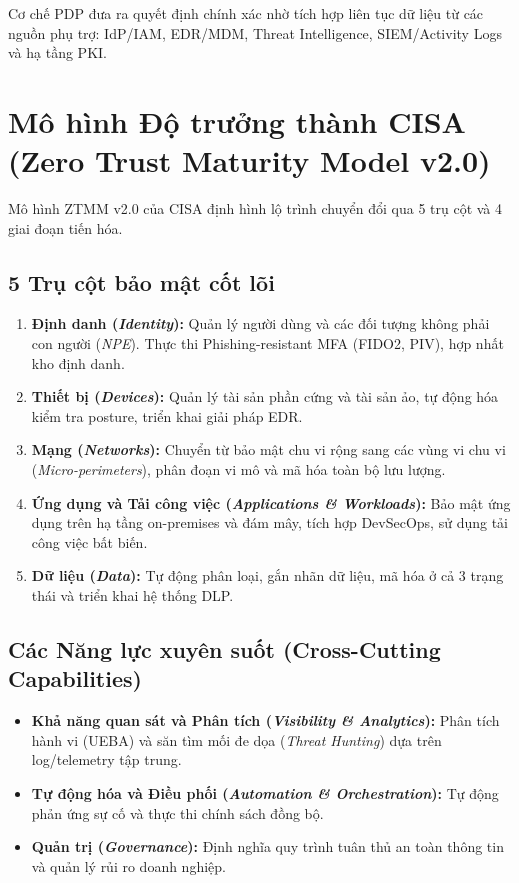 Cơ chế PDP đưa ra quyết định chính xác nhờ tích hợp liên tục dữ liệu từ các nguồn phụ trợ: IdP/IAM, EDR/MDM, Threat Intelligence, SIEM/Activity Logs và hạ tầng PKI.

\section{Mô hình Độ trưởng thành CISA (Zero Trust Maturity Model v2.0)}
\label{sec:2_2}

Mô hình ZTMM v2.0 của CISA định hình lộ trình chuyển đổi qua 5 trụ cột và 4 giai đoạn tiến hóa.

\subsection{5 Trụ cột bảo mật cốt lõi}
\label{subsec:2_2_1}

\begin{enumerate}
    \item \textbf{Định danh (\textit{Identity}):} Quản lý người dùng và các đối tượng không phải con người (\textit{NPE}). Thực thi Phishing-resistant MFA (FIDO2, PIV), hợp nhất kho định danh.
    \item \textbf{Thiết bị (\textit{Devices}):} Quản lý tài sản phần cứng và tài sản ảo, tự động hóa kiểm tra posture, triển khai giải pháp EDR.
    \item \textbf{Mạng (\textit{Networks}):} Chuyển từ bảo mật chu vi rộng sang các vùng vi chu vi (\textit{Micro-perimeters}), phân đoạn vi mô và mã hóa toàn bộ lưu lượng.
    \item \textbf{Ứng dụng và Tải công việc (\textit{Applications \& Workloads}):} Bảo mật ứng dụng trên hạ tầng on-premises và đám mây, tích hợp DevSecOps, sử dụng tải công việc bất biến.
    \item \textbf{Dữ liệu (\textit{Data}):} Tự động phân loại, gắn nhãn dữ liệu, mã hóa ở cả 3 trạng thái và triển khai hệ thống DLP.
\end{enumerate}

\subsection{Các Năng lực xuyên suốt (Cross-Cutting Capabilities)}
\label{subsec:2_2_2}

\begin{itemize}
    \item \textbf{Khả năng quan sát và Phân tích (\textit{Visibility \& Analytics}):} Phân tích hành vi (UEBA) và săn tìm mối đe dọa (\textit{Threat Hunting}) dựa trên log/telemetry tập trung.
    \item \textbf{Tự động hóa và Điều phối (\textit{Automation \& Orchestration}):} Tự động phản ứng sự cố và thực thi chính sách đồng bộ.
    \item \textbf{Quản trị (\textit{Governance}):} Định nghĩa quy trình tuân thủ an toàn thông tin và quản lý rủi ro doanh nghiệp.
\end{itemize}

